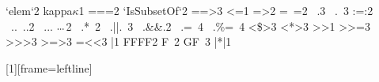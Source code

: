 {   {`elem`}{{\symbmath{\in}}}2 {kappa}{{\ensuremath{\kappa}}}1 {===}{{\symbmath{\equiv}}}2
   {`IsSubsetOf`}{{\symbmath{\subseteq}}}2
   {==>}{{\symbmath{\Longrightarrow}}}{3}
   {<=}{{\symbmath{\leq}}}1 {=>}{{\symbmath{\Rightarrow}}}2  {=~=}{{\symbmath{\cong}}}2
   {\ .}{{\symbmath{\circ}}}3 {\ .\ }{{\symbmath{\circ}}}3 {:=:}{{\symbmath{\approx}}}2
   {\ ..}{{{\color{symb}\ .\!\!.}}}2
   {\ ...}{{\ensuremath{\ .\hspace{-.1ex}.\hspace{-.1ex}.}}}2
   {\ .*}{{\ \symbmath{\bullet}}}{2}
   {\ .||.}{{\ \symbmath{\vee}}}3 {\ .&&.}{{\symbmath{\ \wedge}}}2
   {\ .=}{{\ \symbmath{{:}{=}}}}4
   {\ .\%=}{{\ \symbmath{{:}{\Leftarrow}}}}4
   {<\$>}{{\symbmath{{<}\!{\text{\textdollar}}\!{>}}}}3
   {<*>}{{\symbmath{{<}\!\!\!\ast\!\!\!{>}}}}3
   {>>}{{\symbmath{\gg}}}1 {>>=}{{\symbmath{\gg\mkern-6.5mu=}}}3
   {>>>}{{\symbmath{>\!>\!>}}}3
   {>=>}{{\symbmath{\moncompose}}}3
   {=<<}{{\symbmath{=\mkern-6.5mu\ll}}}3
   {|}{{\symbmath{\mid}}}1
   {FF}{{FF}}2
   {F\ }{{}}2
   {GF\ }{{}}3
   {|*|}{{\symbmath{\otimes}}}1
}

[1][frame=leftline]{\lstset{language=Haskell, #1}}{}

\newcommand{\hask}[1]{\lstinline[backgroundcolor=\color{gray},language=haskell]{#1}}
